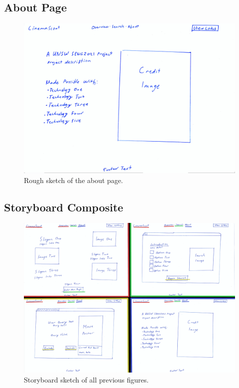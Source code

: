 \documentclass{article}
\begin{document}
\subsection{About Page}
\begin{figure}[H]
\includegraphics[width=\columnwidth]{res/credits.jpg}
\caption{Rough sketch of the about page.}
\end{figure}
\subsection{Storyboard Composite}
\begin{figure}[H]
\includegraphics[width=\columnwidth]{res/arrows.png}
\caption{Storyboard sketch of all previous figures.}
\end{figure}
\end{document}

